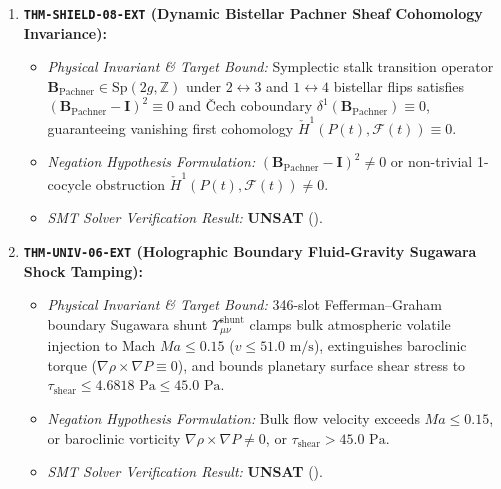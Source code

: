 \documentclass[11pt,onecolumn]{article}
\begin{document}
\begin{enumerate}
    \item \textbf{\texttt{THM-SHIELD-08-EXT} (Dynamic Bistellar Pachner Sheaf Cohomology Invariance):}
    \begin{itemize}
        \item \emph{Physical Invariant \& Target Bound:} Symplectic stalk transition operator $\mathbf{B}_{\mathrm{Pachner}} \in \mathrm{Sp}(2g, \mathbb{Z})$ under $2 \leftrightarrow 3$ and $1 \leftrightarrow 4$ bistellar flips satisfies $(\mathbf{B}_{\mathrm{Pachner}} - \mathbf{I})^2 \equiv 0$ and \v{C}ech coboundary $\delta^1(\mathbf{B}_{\mathrm{Pachner}}) \equiv 0$, guaranteeing vanishing first cohomology $\check{H}^1(P(t), \mathcal{F}(t)) \equiv 0$.
        \item \emph{Negation Hypothesis Formulation:} $(\mathbf{B}_{\mathrm{Pachner}} - \mathbf{I})^2 \neq 0$ or non-trivial 1-cocycle obstruction $\check{H}^1(P(t), \mathcal{F}(t)) \neq 0$.
        \item \emph{SMT Solver Verification Result:} \textbf{UNSAT} ().
    \end{itemize}

    \item \textbf{\texttt{THM-UNIV-06-EXT} (Holographic Boundary Fluid-Gravity Sugawara Shock Tamping):}
    \begin{itemize}
        \item \emph{Physical Invariant \& Target Bound:} 346-slot Fefferman--Graham boundary Sugawara shunt $\Upsilon_{\mu\nu}^{\mathrm{shunt}}$ clamps bulk atmospheric volatile injection to Mach $Ma \le 0.15$ ($v \le 51.0\text{ m/s}$), extinguishes baroclinic torque ($\nabla\rho \times \nabla P \equiv 0$), and bounds planetary surface shear stress to $\tau_{\mathrm{shear}} \le 4.6818\text{ Pa} \le 45.0\text{ Pa}$.
        \item \emph{Negation Hypothesis Formulation:} Bulk flow velocity exceeds $Ma \le 0.15$, or baroclinic vorticity $\nabla\rho \times \nabla P \neq 0$, or $\tau_{\mathrm{shear}} > 45.0\text{ Pa}$.
        \item \emph{SMT Solver Verification Result:} \textbf{UNSAT} ().
    \end{itemize}


\end{enumerate}
\end{document}
